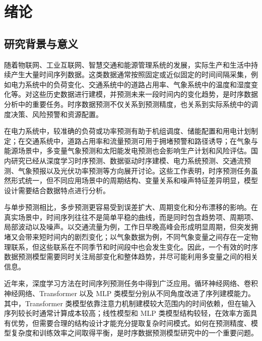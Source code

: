 
\chapter{绪论}

\section{研究背景与意义}

随着物联网、工业互联网、智慧交通和能源管理系统的发展，实际生产和生活中持续产生大量时间序列数据。这类数据通常按照固定或近似固定的时间间隔采集，例如电力系统中的负荷变化、交通系统中的道路占用率、气象系统中的温度和湿度变化等。对这些历史数据进行建模，并预测未来一段时间内的变化趋势，是时序数据分析中的重要任务。时序数据预测不仅关系到预测精度，也关系到实际系统中的调度决策、风险预警和资源配置。

在电力系统中，较准确的负荷或功率预测有助于机组调度、储能配置和用电计划制定；在交通系统中，道路占用率和流量预测可用于拥堵预警和路径诱导；在气象与能源场景中，多变量气象预测和太阳能发电预测也会影响生产计划和风险评估。国内研究已经从深度学习时序预测\cite{liang2023timeseries}、数据驱动时序建模\cite{li2020timeseries}、电力系统预测\cite{miao2023powerforecast}、交通流预测\cite{yao2023trafficflow}、气象预报\cite{huang2025weatherforecast}以及光伏功率预测\cite{cai2024pvforecast}等方向展开讨论。这些工作表明，时序预测任务虽然形式统一，但不同应用场景中的周期结构、变量关系和噪声特征差异明显，模型设计需要结合数据特点进行分析。

与单步预测相比，多步预测更容易受到误差扩大、周期变化和分布漂移的影响。在真实场景中，时间序列往往不是简单平稳的曲线，而是同时包含趋势项、周期项、局部波动以及噪声。以交通流量为例，工作日早晚高峰会形成明显周期，但突发拥堵又会带来短时间内的剧烈变化；以气象数据为例，不同气象变量之间存在一定物理联系，但这些联系在不同季节和时间段中也会发生变化。因此，一个有效的时序数据预测模型需要同时关注局部变化和整体趋势，并尽可能利用多变量之间的相关信息。

近年来，深度学习方法在时间序列预测任务中得到广泛应用。循环神经网络、卷积神经网络、Transformer 以及 MLP 类模型分别从不同角度改进了序列建模能力。其中，Transformer 类模型依靠注意力机制建模较大范围内的时间依赖，但在输入序列较长时通常计算成本较高；线性模型和 MLP 类模型结构较轻，在效率方面具有优势，但需要合理的结构设计才能充分提取复杂时间模式。如何在预测精度、模型复杂度和训练效率之间取得平衡，是时序数据预测模型研究中的一个重要问题。

